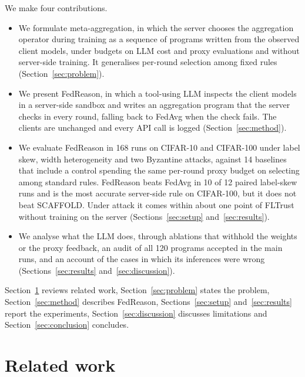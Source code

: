 \documentclass[3p,times,a4paper]{elsarticle}
\begin{document}
We make four contributions.
\begin{itemize}
  \item We formulate meta-aggregation, in which the server chooses the aggregation operator during training as a sequence of programs written from the observed client models, under budgets on LLM cost and proxy evaluations and without server-side training. It generalises per-round selection among fixed rules~\cite{haque2025fedstrategist} (Section~\ref{sec:problem}).
  \item We present FedReason, in which a tool-using LLM inspects the client models in a server-side sandbox and writes an aggregation program that the server checks in every round, falling back to FedAvg when the check fails. The clients are unchanged and every API call is logged (Section~\ref{sec:method}).
  \item We evaluate FedReason in 168 runs on CIFAR-10 and CIFAR-100 under label skew, width heterogeneity and two Byzantine attacks, against 14 baselines that include a control spending the same per-round proxy budget on selecting among standard rules. FedReason beats FedAvg in 10 of 12 paired label-skew runs and is the most accurate server-side rule on CIFAR-100, but it does not beat SCAFFOLD. Under attack it comes within about one point of FLTrust without training on the server (Sections~\ref{sec:setup} and~\ref{sec:results}).
  \item We analyse what the LLM does, through ablations that withhold the weights or the proxy feedback, an audit of all 120 programs accepted in the main runs, and an account of the cases in which its inferences were wrong (Sections~\ref{sec:results} and~\ref{sec:discussion}).
\end{itemize}
Section~\ref{sec:related} reviews related work, Section~\ref{sec:problem} states the problem, Section~\ref{sec:method} describes FedReason, Sections~\ref{sec:setup} and~\ref{sec:results} report the experiments, Section~\ref{sec:discussion} discusses limitations and Section~\ref{sec:conclusion} concludes.

\section{Related work}
\label{sec:related}
\end{document}

